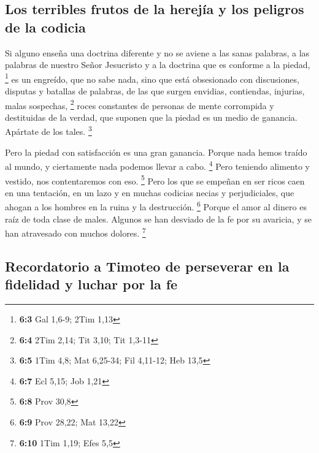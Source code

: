 \begin{paracol}{2}
\hypertarget{los-terribles-frutos-de-la-herejuxeda-y-los-peligros-de-la-codicia}{%
\subsection{Los terribles frutos de la herejía y los peligros de la
codicia}\label{los-terribles-frutos-de-la-herejuxeda-y-los-peligros-de-la-codicia}}

 Si alguno enseña una doctrina diferente y no se aviene a
las sanas palabras, a las palabras de nuestro Señor Jesucristo y a la
doctrina que es conforme a la piedad, \footnote{\textbf{6:3} Gal 1,6-9;
  2Tim 1,13}  es un engreído, que no sabe nada, sino que
está obsesionado con discusiones, disputas y batallas de palabras, de
las que surgen envidias, contiendas, injurias, malas sospechas,
\footnote{\textbf{6:4} 2Tim 2,14; Tit 3,10; Tit 1,3-11} 
roces constantes de personas de mente corrompida y destituidas de la
verdad, que suponen que la piedad es un medio de ganancia. Apártate de
los tales. \footnote{\textbf{6:5} 1Tim 4,8; Mat 6,25-34; Fil 4,11-12;
  Heb 13,5}

 Pero la piedad con satisfacción es una gran ganancia.
 Porque nada hemos traído al mundo, y ciertamente nada
podemos llevar a cabo. \footnote{\textbf{6:7} Ecl 5,15; Job 1,21}
 Pero teniendo alimento y vestido, nos contentaremos con
eso. \footnote{\textbf{6:8} Prov 30,8}  Pero los que se
empeñan en ser ricos caen en una tentación, en un lazo y en muchas
codicias necias y perjudiciales, que ahogan a los hombres en la ruina y
la destrucción. \footnote{\textbf{6:9} Prov 28,22; Mat 13,22}
 Porque el amor al dinero es raíz de toda clase de males.
Algunos se han desviado de la fe por su avaricia, y se han atravesado
con muchos dolores. \footnote{\textbf{6:10} 1Tim 1,19; Efes 5,5}

\hypertarget{recordatorio-a-timoteo-de-perseverar-en-la-fidelidad-y-luchar-por-la-fe}{%
\subsection{Recordatorio a Timoteo de perseverar en la fidelidad y
luchar por la
fe}\label{recordatorio-a-timoteo-de-perseverar-en-la-fidelidad-y-luchar-por-la-fe}}


\end{paracol}

